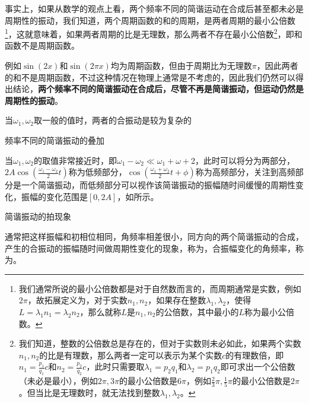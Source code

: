 事实上，如果从数学的观点上看，两个频率不同的简谐运动在合成后甚至都未必是周期性的振动，我们知道，两个周期函数的和的周期，是两者周期的最小公倍数\footnote{我们通常所说的最小公倍数都是对于自然数而言的，而周期通常是实数，例如$2\pi$，故拓展定义为，对于实数$n_1,n_2$，如果存在整数$\lambda_1,\lambda_2$，使得$L=\lambda_1 n_1=\lambda_2 n_2$，那么就称$L$是$n_1,n_2$的公倍数，其中最小的$L$称为最小公倍数。}，这就意味着，如果两者周期的比是无理数，那么两者不存在最小公倍数\footnote{我们知道，整数的公倍数总是存在的，但对于实数则未必如此，如果两个实数$n_1,n_2$的比是有理数，那么两者一定可以表示为某个实数$c$的有理数倍，即$n_1=\frac{p_1}{q_1}c$和$n_2=\frac{p_2}{q_2}c$，此时只需要取$\lambda_1=p_2q_1$和$\lambda_2=p_1q_2$即可求出一个公倍数（未必是最小），例如$2\pi,3\pi$的最小公倍数是$6\pi$，例如$\frac{2}{3}\pi,\frac{1}{5}\pi$的最小公倍数是$2\pi$。但当比是无理数时，就无法找到整数$\lambda_1,\lambda_2$。}，即和函数不是周期函数。

例如$\sin(2x)$和$\sin(2\pi x)$均为周期函数，但由于周期比为无理数$\pi$，因此两者的和不是周期函数，不过这种情况在物理上通常是不考虑的，因此我们仍然可以得出结论，\textbf{两个频率不同的简谐振动在合成后，尽管不再是简谐振动，但运动仍然是周期性的振动}。

当$\omega_1,\omega_2$取一般的值时，两者的合振动是较为复杂的
\begin{Figure}{频率不同的简谐振动的叠加}
    \qquad
\end{Figure}

当$\omega_1,\omega_2$的取值非常接近时，即$\omega_1-\omega_2\ll\omega_1+\omega+2$，此时可以将分为两部分，$2A\cos(\frac{\omega_1-\omega_2}{2}t)$称为低频部分，$\cos(\frac{\omega_1+\omega_2}{2}t+\phi)$称为高频部分，关注到高频部分是一个简谐振动，而低频部分可以视作该简谐振动的振幅随时间缓慢的周期性变化，振幅的变化范围是$[0,2A]$，如所示。
\begin{Figure}{简谐振动的拍现象}
\end{Figure}

通常把这样振幅和初相位相同，角频率相差很小，同方向的两个简谐振动的合成，产生的合振动的振幅随时间做周期性变化的现象，称为，合振幅变化的角频率，称为。

